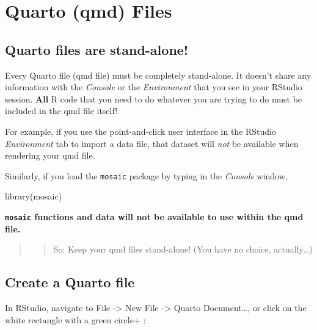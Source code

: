 \documentclass[
  letterpaper,
  DIV=11,
  numbers=noendperiod]{scrreprt}
\newenvironment{Shaded}{\begin{snugshade}}{\end{snugshade}}
\newcommand{\FunctionTok}[1]{\textcolor[rgb]{0.28,0.35,0.67}{#1}}
\newcommand{\NormalTok}[1]{\textcolor[rgb]{0.00,0.23,0.31}{#1}}
\theoremstyle{remark}
\begin{document}
\section{Quarto (qmd) Files}\label{quarto-qmd-files}

\subsection{Quarto files are
stand-alone!}\label{quarto-files-are-stand-alone}

Every Quarto file (qmd file) must be completely stand-alone. It doesn't
share any information with the \emph{Console} or the \emph{Environment}
that you see in your RStudio session. \textbf{All} R code that you need
to do whatever you are trying to do must be included in the qmd file
itself!

For example, if you use the point-and-click user interface in the
RStudio \emph{Environment} tab to import a data file, that dataset will
\emph{not} be available when rendering your qmd file.

Similarly, if you load the \texttt{mosaic} package by typing in the
\emph{Console} window,

\begin{Shaded}
\begin{Highlighting}[]
\FunctionTok{library}\NormalTok{(mosaic)}
\end{Highlighting}
\end{Shaded}

\textbf{\texttt{mosaic} functions and data will not be available to use
within the qmd file.}

\begin{quote}
\begin{quote}
So: Keep your qmd files stand-alone! (You have no choice,
actually\ldots)
\end{quote}
\end{quote}

\subsection{Create a Quarto file}\label{create-a-quarto-file}

In RStudio, navigate to File -\textgreater{} New File -\textgreater{}
Quarto Document\ldots, or click on the white rectangle with a green
circle+ :
\end{document}
